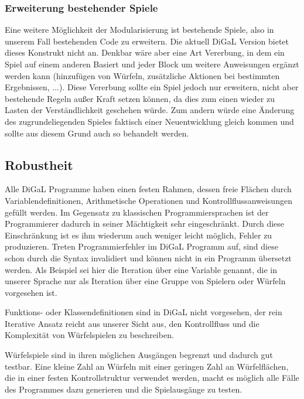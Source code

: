 \subsubsection{Erweiterung bestehender Spiele}
\label{subsub:erweiterung_bestehender_spiele}
	Eine weitere Möglichkeit der Modularisierung ist bestehende Spiele, also in unserem Fall bestehenden Code zu erweitern. Die aktuell DiGaL Version bietet dieses Konstrukt nicht an. Denkbar wäre aber eine Art Vererbung, in dem ein Spiel auf einem anderen Basiert und jeder Block um weitere Anweisungen ergänzt werden kann (hinzufügen von Würfeln, zusätzliche Aktionen bei bestimmten Ergebnissen, ...). Diese Vererbung sollte ein Spiel jedoch nur erweitern, nicht aber bestehende Regeln außer Kraft setzen können, da dies zum einen wieder zu Lasten der Verständlichkeit geschehen würde. Zum andern würde eine Änderung des zugrundeliegenden Spieles faktisch einer Neuentwicklung gleich kommen und sollte aus diesem Grund auch so behandelt werden.


\subsection{Robustheit} %
\label{sub:robustheit}
Alle DiGaL Programme haben einen festen Rahmen, dessen freie Flächen durch Variablendefinitionen, Arithmetische Operationen und Kontrollflussanweisungen gefüllt werden. Im Gegensatz zu klassischen Programmiersprachen ist der Programmierer dadurch in seiner Mächtigkeit sehr eingeschränkt. Durch diese Einschränkung ist es ihm wiederum auch weniger leicht möglich, Fehler zu produzieren. Treten Programmierfehler im DiGaL Programm auf, sind diese schon durch die Syntax invalidiert und können nicht in ein Programm übersetzt werden. Als Beispiel sei hier die Iteration über eine Variable genannt, die in unserer Sprache nur als Iteration über eine Gruppe von Spielern oder Würfeln vorgesehen ist. 

Funktions- oder Klassendefinitionen sind in DiGaL nicht vorgesehen, der rein Iterative Ansatz reicht aus unserer Sicht aus, den Kontrollfluss und die Komplexität von Würfelspielen zu beschreiben.

Würfelspiele sind in ihren möglichen Ausgängen begrenzt und dadurch gut testbar. Eine kleine Zahl an Würfeln mit einer geringen Zahl an Würfelflächen, die in einer festen Kontrollstruktur verwendet werden, macht es möglich alle Fälle des Programmes dazu generieren und die Spielausgänge zu testen.

